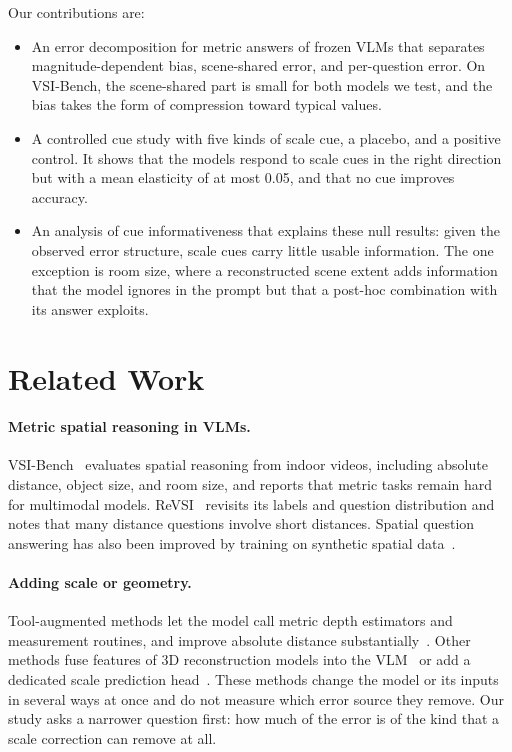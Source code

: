 \documentclass[letterpaper]{article} %
\begin{document}
Our contributions are:
\begin{itemize}
\item An error decomposition for metric answers of frozen VLMs that separates magnitude-dependent bias, scene-shared error, and per-question error. On VSI-Bench, the scene-shared part is small for both models we test, and the bias takes the form of compression toward typical values.
\item A controlled cue study with five kinds of scale cue, a placebo, and a positive control. It shows that the models respond to scale cues in the right direction but with a mean elasticity of at most 0.05, and that no cue improves accuracy.
\item An analysis of cue informativeness that explains these null results: given the observed error structure, scale cues carry little usable information. The one exception is room size, where a reconstructed scene extent adds information that the model ignores in the prompt but that a post-hoc combination with its answer exploits.
\end{itemize}

\section{Related Work}

\paragraph{Metric spatial reasoning in VLMs.}
VSI-Bench~\citep{yang2025thinking} evaluates spatial reasoning from indoor videos, including absolute distance, object size, and room size, and reports that metric tasks remain hard for multimodal models. ReVSI~\citep{zhang2026revsi} revisits its labels and question distribution and notes that many distance questions involve short distances. Spatial question answering has also been improved by training on synthetic spatial data~\citep{chen2024spatialvlm,cheng2024spatialrgpt}.

\paragraph{Adding scale or geometry.}
Tool-augmented methods let the model call metric depth estimators and measurement routines, and improve absolute distance substantially~\citep{glantz2026seeing,izhac2026spacemcp}. Other methods fuse features of 3D reconstruction models into the VLM~\citep{fan2025vlm3r,li2025spatialforcing} or add a dedicated scale prediction head~\citep{zhou2025robotracer}. These methods change the model or its inputs in several ways at once and do not measure which error source they remove. Our study asks a narrower question first: how much of the error is of the kind that a scale correction can remove at all.
\end{document}
